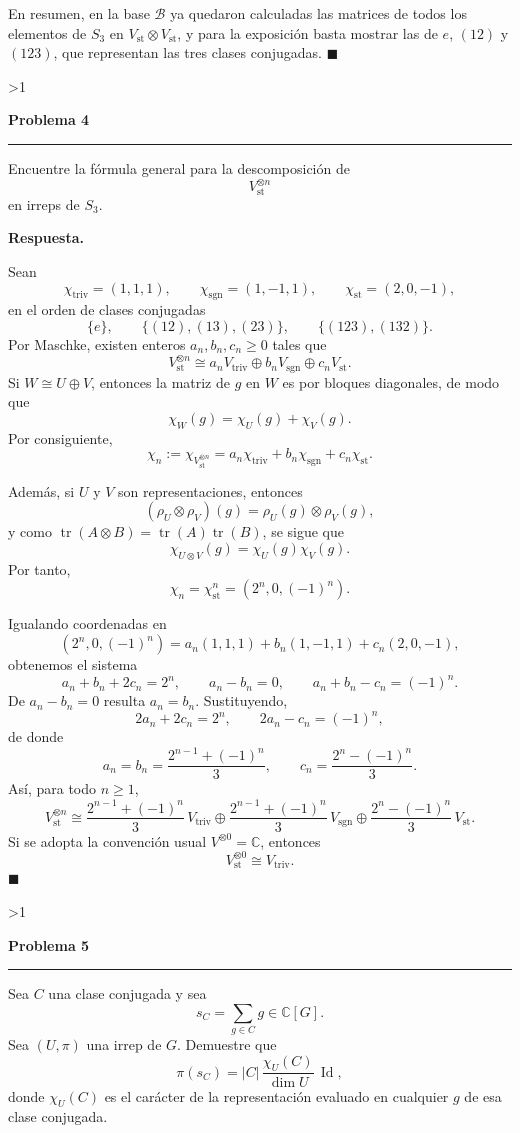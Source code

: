 \documentclass[10pt,a4paper]{article}
\newcommand{\CC}{\mathbb{C}}
\newcommand{\Id}{\operatorname{Id}}
\newcommand{\inlinehead}[2][repblue]{%
  \par\smallskip
  {\color{#1}\bfseries #2.}\hspace{0.45em}%
}
\newcommand{\answer}{\inlinehead{Respuesta}}
\newcounter{probcnt}
\newcommand{\problem}[2]{%
  \stepcounter{probcnt}%
  \ifnum\value{probcnt}>1\newpage\fi
  \par\vspace{0.25em}
  {\large\bfseries\color{repblue} Problema #1}\par
  {\color{repline}\rule{\linewidth}{0.55pt}}\par
  \begin{tcolorbox}[
    breakable,
    colback=white,
    colframe=repline,
    borderline west={1.6pt}{0pt}{repteal},
    left=0.7em,
    right=0.7em,
    top=0.35em,
    bottom=0.3em,
    before skip=0.35em,
    after skip=0.45em
  ]
    #2
  \end{tcolorbox}
}
\begin{document}
En resumen, en la base $\mathcal{B}$ ya quedaron calculadas las matrices de
todos los elementos de $S_3$ en $V_{\mathrm{st}}\otimes V_{\mathrm{st}}$, y para la
exposición basta mostrar las de $e$, $(12)$ y $(123)$, que representan las tres
clases conjugadas.
\hfill$\blacksquare$

\problem{4}{%
Encuentre la fórmula general para la descomposición de
\[
  V_{\mathrm{st}}^{\otimes n}
\]
en irreps de $S_3$.
}

\answer
Sean
\[
  \chi_{\mathrm{triv}}=(1,1,1),
  \qquad
  \chi_{\mathrm{sgn}}=(1,-1,1),
  \qquad
  \chi_{\mathrm{st}}=(2,0,-1),
\]
en el orden de clases conjugadas
\[
  \{e\},
  \qquad
  \{(12),(13),(23)\},
  \qquad
  \{(123),(132)\}.
\]
Por Maschke, existen enteros $a_n,b_n,c_n\ge 0$ tales que
\[
  V_{\mathrm{st}}^{\otimes n}
  \cong a_nV_{\mathrm{triv}}\oplus b_nV_{\mathrm{sgn}}\oplus c_nV_{\mathrm{st}}.
\]
Si $W\cong U\oplus V$, entonces la matriz de $g$ en $W$ es por bloques diagonales,
de modo que
\[
  \chi_W(g)=\chi_U(g)+\chi_V(g).
\]
Por consiguiente,
\[
  \chi_n:=\chi_{V_{\mathrm{st}}^{\otimes n}}
  =a_n\chi_{\mathrm{triv}}+b_n\chi_{\mathrm{sgn}}+c_n\chi_{\mathrm{st}}.
\]

Además, si $U$ y $V$ son representaciones, entonces
\[
  (\rho_U\otimes\rho_V)(g)=\rho_U(g)\otimes\rho_V(g),
\]
y como $\operatorname{tr}(A\otimes B)=\operatorname{tr}(A)\operatorname{tr}(B)$,
se sigue que
\[
  \chi_{U\otimes V}(g)=\chi_U(g)\chi_V(g).
\]
Por tanto,
\[
  \chi_n=\chi_{\mathrm{st}}^n=(2^n,0,(-1)^n).
\]

Igualando coordenadas en
\[
  (2^n,0,(-1)^n)
  =a_n(1,1,1)+b_n(1,-1,1)+c_n(2,0,-1),
\]
obtenemos el sistema
\[
  a_n+b_n+2c_n=2^n,
  \qquad
  a_n-b_n=0,
  \qquad
  a_n+b_n-c_n=(-1)^n.
\]
De $a_n-b_n=0$ resulta $a_n=b_n$. Sustituyendo,
\[
  2a_n+2c_n=2^n,
  \qquad
  2a_n-c_n=(-1)^n,
\]
de donde
\[
  a_n=b_n=\frac{2^{n-1}+(-1)^n}{3},
  \qquad
  c_n=\frac{2^n-(-1)^n}{3}.
\]
Así, para todo $n\ge 1$,
\[
  V_{\mathrm{st}}^{\otimes n}
  \cong
  \frac{2^{n-1}+(-1)^n}{3}\,V_{\mathrm{triv}}
  \oplus
  \frac{2^{n-1}+(-1)^n}{3}\,V_{\mathrm{sgn}}
  \oplus
  \frac{2^n-(-1)^n}{3}\,V_{\mathrm{st}}.
\]
Si se adopta la convención usual $V^{\otimes 0}=\CC$, entonces
\[
  V_{\mathrm{st}}^{\otimes 0}\cong V_{\mathrm{triv}}.
\]
\hfill$\blacksquare$

\problem{5}{%
Sea $C$ una clase conjugada y sea
\[
  s_C = \sum_{g\in C} g \in \CC[G].
\]
Sea $(U,\pi)$ una irrep de $G$. Demuestre que
\[
  \pi(s_C) = |C|\,\frac{\chi_U(C)}{\dim U}\,\Id,
\]
donde $\chi_U(C)$ es el carácter de la representación evaluado en cualquier $g$ de esa
clase conjugada.
}
\end{document}
